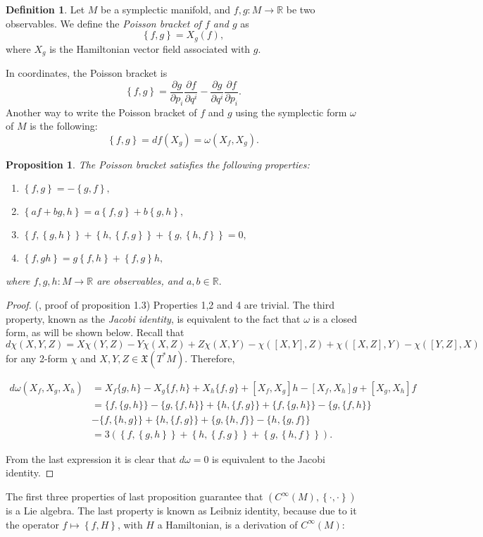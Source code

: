 \documentclass[12pt, letterpaper, reqno]{amsart}
\theoremstyle{definition}
\newtheorem{df}{Definition}
\theoremstyle{plain}
\newtheorem{prop}{Proposition}
\theoremstyle{remark}
\begin{document}
\begin{df}
	Let $ M $ be a symplectic manifold, and $ f,g: M \rightarrow \mathbb{R} $ be two observables. We define the \textit{Poisson bracket of $ f $ and $ g $ } as 
	$$ \left\{ f,g \right\}= X_g(f),$$ 
	where $ X_g  $ is the Hamiltonian vector field associated with $ g. $ 
\end{df}
In coordinates, the Poisson bracket is 
$$ \left\{ f,g \right\} = \frac{\partial g}{\partial p_i}\frac{\partial f}{\partial q^i} - \frac{\partial g}{\partial q^i} \frac{\partial f}{\partial p_i}.   $$ 
Another way to write the Poisson bracket of $ f $ and $ g $ using the symplectic form $ \omega $ of $M$ is the following:
$$ \left\{ f,g \right\} = df(X_g)=\omega (X_f,X_g). $$ 
\begin{prop}
	The Poisson bracket satisfies the following properties:
	\begin{enumerate}
		\item $ \left\{ f,g \right\} = -\left\{ g,f \right\},$ 
		\item $ \left\{ af+bg,h \right\} = a\left\{ f,g \right\}+ b \left\{ g,h \right\} ,   $ 
		\item $ \left\{ f, \left\{ g,h \right\}  \right\} +\left\{ h, \left\{ f,g \right\}  \right\} + \left\{ g, \left\{ h,f \right\}  \right\} =0, $  
		\item $ \left\{ f,gh \right\} =g \left\{ f,h \right\} + \left\{ f,g \right\} h,$ 
	\end{enumerate}
	where $ f,g,h: M \rightarrow \mathbb{R} $ are observables, and $ a,b\in \mathbb{R}. $ 
\end{prop}
\begin{proof}
	(\cite{poisson}, proof of proposition 1.3) Properties 1,2 and 4 are trivial. The third property, known as the \textit{Jacobi identity},  is equivalent to the fact that $ \omega $ is a closed form, as will be shown below. Recall that $$ d\chi(X,Y,Z)=X\chi(Y,Z)-Y\chi(X,Z)+Z\chi(X,Y)-\chi([X,Y],Z)+\chi([X,Z],Y)-\chi([Y,Z],X) $$ 
	for any 2-form $ \chi $ and $ X,Y,Z\in \mathfrak{X}(T^*M). $ Therefore, 


$\begin{aligned}
	d \omega\left(X_{f}, X_{g}, X_{h}\right) &=X_{f}\{g, h\}-X_{g}\{f, h\}+X_{h}\{f, g\}+\left[X_{f}, X_{g}\right] h-\left[X_{f}, X_{h}\right] g+\left[X_{g}, X_{h}\right] f \\
&=\{f,\{g, h\}\}-\{g,\{f, h\}\}+\{h,\{f, g\}\}+\{f,\{g, h\}\}-\{g,\{f, h\}\} \\
&-\{f,\{h, g\}\}+\{h,\{f, g\}\}+\{g,\{h, f\}\}-\{h,\{g, f\}\} \\
&=3 \left( \left\{ f, \left\{ g,h \right\}  \right\} +\left\{ h, \left\{ f,g \right\}  \right\} + \left\{ g, \left\{ h,f \right\}  \right\}\right).  
\end{aligned}$

From the last expression it is clear that $ d\omega=0 $ is equivalent to the Jacobi identity.
\end{proof}
The first three properties of last proposition guarantee that $ \left( C^\infty(M), \left\{ \cdot,\cdot \right\}  \right) $ is a Lie algebra. The last property is known as Leibniz identity, because due to it the operator $ f\mapsto \left\{ f,H \right\}  $, with $ H $ a Hamiltonian, is a derivation of $ C^\infty(M): $ 
\end{document}
